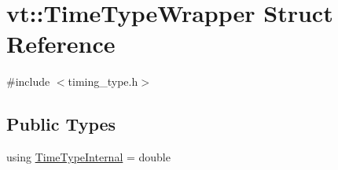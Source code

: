 \hypertarget{structvt_1_1_time_type_wrapper}{}\section{vt\+:\+:Time\+Type\+Wrapper Struct Reference}
\label{structvt_1_1_time_type_wrapper}


{\ttfamily \#include $<$timing\+\_\+type.\+h$>$}

\subsection*{Public Types}
\begin{DoxyCompactItemize}
\item 
using \hyperlink{structvt_1_1_time_type_wrapper_a932f8d925e6c43e898fb8761ea667ef1}{Time\+Type\+Internal} = double
\end{DoxyCompactItemize}
